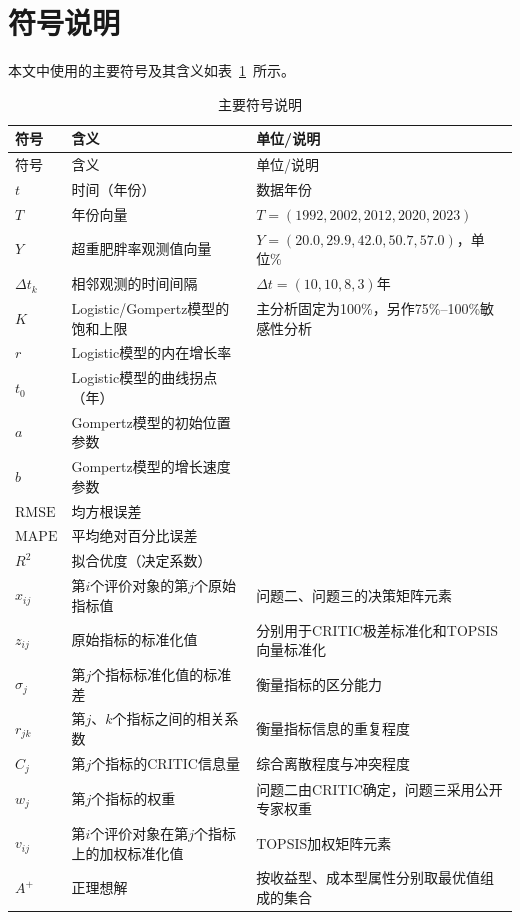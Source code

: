\section{符号说明}

本文中使用的主要符号及其含义如表~\ref{tab:symbols}~所示。

\begingroup
\small
\setlength{\tabcolsep}{3pt}
\begin{longtable}{p{1.6cm}p{4.0cm}p{6.5cm}}
\caption{主要符号说明}\label{tab:symbols}\\
\toprule
符号 & 含义 & 单位/说明 \\
\midrule
\endfirsthead
\toprule
符号 & 含义 & 单位/说明 \\
\midrule
\endhead
$t$ & 时间（年份） & 数据年份 \\
$T$ & 年份向量 & $T=(1992,2002,2012,2020,2023)$ \\
$Y$ & 超重肥胖率观测值向量 & $Y=(20.0,29.9,42.0,50.7,57.0)$，单位\% \\
$\Delta t_k$ & 相邻观测的时间间隔 & $\Delta t=(10,10,8,3)$年 \\
$K$ & Logistic/Gompertz模型的饱和上限 & 主分析固定为100\%，另作75\%--100\%敏感性分析 \\
$r$ & Logistic模型的内在增长率 & \\
$t_0$ & Logistic模型的曲线拐点（年） & \\
$a$ & Gompertz模型的初始位置参数 & \\
$b$ & Gompertz模型的增长速度参数 & \\
$\mathrm{RMSE}$ & 均方根误差 & \\
$\mathrm{MAPE}$ & 平均绝对百分比误差 & \\
$R^2$ & 拟合优度（决定系数） & \\
\midrule
$x_{ij}$ & 第$i$个评价对象的第$j$个原始指标值 & 问题二、问题三的决策矩阵元素 \\
$z_{ij}$ & 原始指标的标准化值 & 分别用于CRITIC极差标准化和TOPSIS向量标准化 \\
$\sigma_j$ & 第$j$个指标标准化值的标准差 & 衡量指标的区分能力 \\
$r_{jk}$ & 第$j$、$k$个指标之间的相关系数 & 衡量指标信息的重复程度 \\
$C_j$ & 第$j$个指标的CRITIC信息量 & 综合离散程度与冲突程度 \\
$w_j$ & 第$j$个指标的权重 & 问题二由CRITIC确定，问题三采用公开专家权重 \\
$v_{ij}$ & 第$i$个评价对象在第$j$个指标上的加权标准化值 & TOPSIS加权矩阵元素 \\
$A^+$ & 正理想解 & 按收益型、成本型属性分别取最优值组成的集合 \\

\end{longtable}
